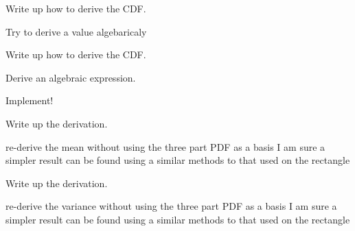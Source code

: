 
\begin{DoxyRefList}
\item[\label{todo__todo000001}%
\hypertarget{todo__todo000001}{}%
Global \hyperlink{_cube_8h_aa32dd25cda8601c7f6af2dbd096dc58c}{Cube\-Distance\-C\-D\-F} (double a, double $\ast$b)]Write up how to derive the C\-D\-F.  
\item[\label{todo__todo000002}%
\hypertarget{todo__todo000002}{}%
Global \hyperlink{_cube_8h_ac37d5ff3c99d8637fc414212ac041f18}{Cube\-Distance\-Var} (double $\ast$parameters)]Try to derive a value algebaricaly  
\item[\label{todo__todo000003}%
\hypertarget{todo__todo000003}{}%
Global \hyperlink{_disk_8h_a8958adae00c0c55d68c1e81deb51c06b}{Disk\-Distance\-C\-D\-F} (double a, double $\ast$b)]Write up how to derive the C\-D\-F.  
\item[\label{todo__todo000004}%
\hypertarget{todo__todo000004}{}%
Global \hyperlink{_disk_8h_a156ab336770f189207572a9282158392}{Disk\-Distance\-Var} (double $\ast$parameters)]Derive an algebraic expression.  
\item[\label{todo__todo000005}%
\hypertarget{todo__todo000005}{}%
Global \hyperlink{_hyperball_8h_a911b77b473d55872774163ed724af6f3}{Hyperball\-Distance\-C\-D\-F} (double t, double $\ast$parameters)]Implement!  
\item[\label{todo__todo000007}%
\hypertarget{todo__todo000007}{}%
Global \hyperlink{_prism_geodesic_8h_a8fb219075b27e66757a3b5c234097c4d}{Prism\-Geodesic\-Distance\-C\-D\-F} (double t, double $\ast$parameters)]Write up the derivation.  
\item[\label{todo__todo000008}%
\hypertarget{todo__todo000008}{}%
Global \hyperlink{_prism_geodesic_8h_a8ac24433806e383dec481431b92b4606}{Prism\-Geodesic\-Distance\-Mean} (double $\ast$parameters)]re-\/derive the mean without using the three part P\-D\-F as a basis I am sure a simpler result can be found using a similar methods to that used on the rectangle  
\item[\label{todo__todo000006}%
\hypertarget{todo__todo000006}{}%
Global \hyperlink{_prism_geodesic_8h_a674a98341a80a5b8589352280f89173c}{Prism\-Geodesic\-Distance\-P\-D\-F} (double t, double $\ast$parameters)]Write up the derivation.  
\item[\label{todo__todo000009}%
\hypertarget{todo__todo000009}{}%
Global \hyperlink{_prism_geodesic_8h_ac804282eeada51c4b8b2e2ae636d1bab}{Prism\-Geodesic\-Distance\-Var} (double $\ast$parameters)]re-\/derive the variance without using the three part P\-D\-F as a basis I am sure a simpler result can be found using a similar methods to that used on the rectangle  

\end{DoxyRefList}
